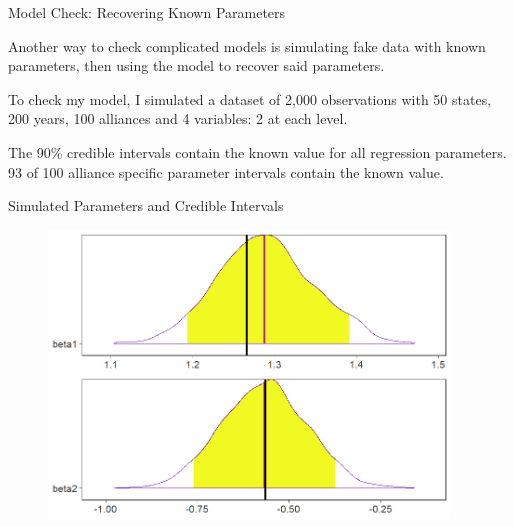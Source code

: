 \documentclass[12pt]{beamer}
\begin{document}

\begin{frame}{Model Check: Recovering Known Parameters}

Another way to check complicated models is simulating fake data with known parameters, then using the model to recover said parameters. 

To check my model, I simulated a dataset of 2,000 observations with 50 states, 200 years, 100 alliances and 4 variables: 2 at each level.

The 90\% credible intervals contain the known value for all regression parameters. 93 of 100 alliance specific parameter intervals contain the known value. 

\end{frame}



\begin{frame}{Simulated Parameters and Credible Intervals}


\begin{figure}
	\centering
		\includegraphics[width=0.95\textwidth]{sim-check-res.png}
\end{figure} 

\end{frame}



\end{document}
